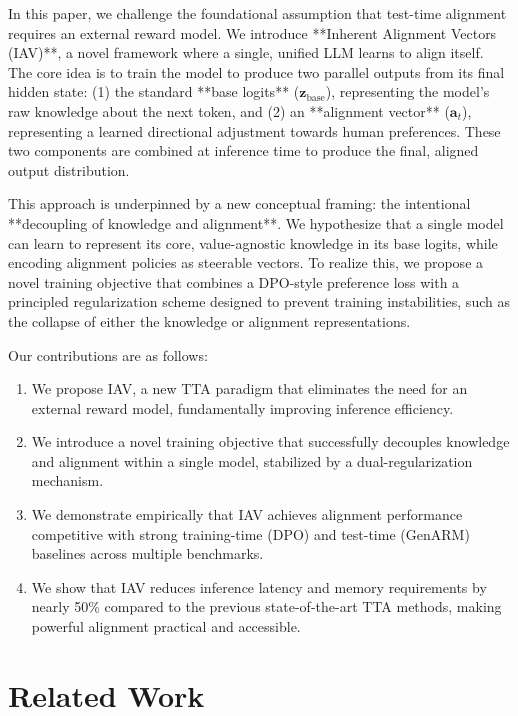 \documentclass{article}
\begin{document}
In this paper, we challenge the foundational assumption that test-time alignment requires an external reward model. We introduce **Inherent Alignment Vectors (IAV)**, a novel framework where a single, unified LLM learns to align itself. The core idea is to train the model to produce two parallel outputs from its final hidden state: (1) the standard **base logits** ($\mathbf{z}_{\text{base}}$), representing the model's raw knowledge about the next token, and (2) an **alignment vector** ($\mathbf{a}_t$), representing a learned directional adjustment towards human preferences. These two components are combined at inference time to produce the final, aligned output distribution.

This approach is underpinned by a new conceptual framing: the intentional **decoupling of knowledge and alignment**. We hypothesize that a single model can learn to represent its core, value-agnostic knowledge in its base logits, while encoding alignment policies as steerable vectors. To realize this, we propose a novel training objective that combines a DPO-style preference loss with a principled regularization scheme designed to prevent training instabilities, such as the collapse of either the knowledge or alignment representations.

Our contributions are as follows:
\begin{enumerate}
    \item We propose IAV, a new TTA paradigm that eliminates the need for an external reward model, fundamentally improving inference efficiency.
    \item We introduce a novel training objective that successfully decouples knowledge and alignment within a single model, stabilized by a dual-regularization mechanism.
    \item We demonstrate empirically that IAV achieves alignment performance competitive with strong training-time (DPO) and test-time (GenARM) baselines across multiple benchmarks.
    \item We show that IAV reduces inference latency and memory requirements by nearly 50\% compared to the previous state-of-the-art TTA methods, making powerful alignment practical and accessible.
\end{enumerate}

\section{Related Work}
\end{document}
